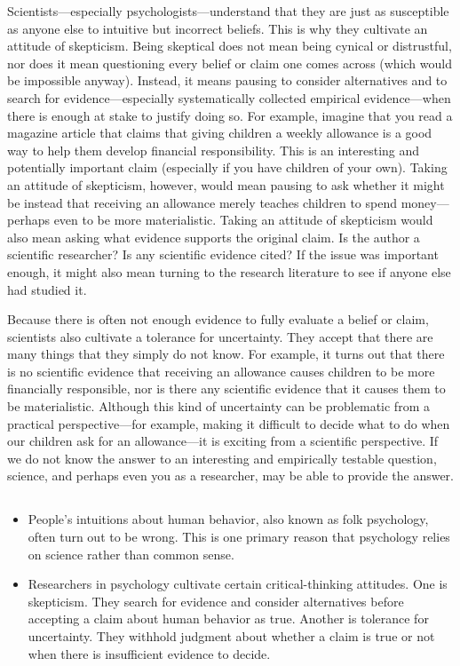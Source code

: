 Scientists---especially psychologists---understand that they are just as susceptible as anyone else to intuitive but incorrect beliefs. This is why they cultivate an attitude of skepticism. Being skeptical does not mean being cynical or distrustful, nor does it mean questioning every belief or claim one comes across (which would be impossible anyway). Instead, it means pausing to consider alternatives and to search for evidence---especially systematically collected empirical evidence---when there is enough at stake to justify doing so. For example, imagine that you read a magazine article that claims that giving children a weekly allowance is a good way to help them develop financial responsibility. This is an interesting and potentially important claim (especially if you have children of your own). Taking an attitude of skepticism, however, would mean pausing to ask whether it might be instead that receiving an allowance merely teaches children to spend money---perhaps even to be more materialistic. Taking an attitude of skepticism would also mean asking what evidence supports the original claim. Is the author a scientific researcher? Is any scientific evidence cited? If the issue was important enough, it might also mean turning to the research literature to see if anyone else had studied it.

Because there is often not enough evidence to fully evaluate a belief or claim, scientists also cultivate a tolerance for uncertainty. They accept that there are many things that they simply do not know. For example, it turns out that there is no scientific evidence that receiving an allowance causes children to be more financially responsible, nor is there any scientific evidence that it causes them to be materialistic. Although this kind of uncertainty can be problematic from a practical perspective---for example, making it difficult to decide what to do when our children ask for an allowance---it is exciting from a scientific perspective. If we do not know the answer to an interesting and empirically testable question, science, and perhaps even you as a researcher, may be able to provide the answer.

\subsection{}
\begin{fullwidth}
\begin{itemize}
\item People's intuitions about human behavior, also known as folk psychology, often turn out to be wrong. This is one primary reason that psychology relies on science rather than common sense.
\item Researchers in psychology cultivate certain critical-thinking attitudes. One is skepticism. They search for evidence and consider alternatives before accepting a claim about human behavior as true. Another is tolerance for uncertainty. They withhold judgment about whether a claim is true or not when there is insufficient evidence to decide.
\end{itemize}
\end{fullwidth}

